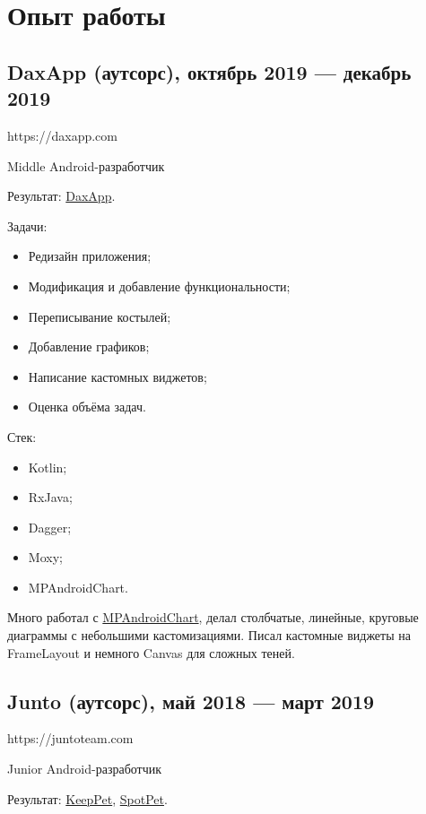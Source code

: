 \documentclass[a4paper,12pt]{article}
\begin{document}
    \section*{Опыт работы}

    \subsection*{DaxApp (аутсорс), октябрь 2019 --- декабрь 2019}

    https://daxapp.com\par
    Middle Android-разработчик

    Результат: \href{https://play.google.com/store/apps/details?id=com.app.qavala1}{DaxApp}.

    Задачи:
    \begin{itemize}
        \item Редизайн приложения;
        \item Модификация и добавление функциональности;
        \item Переписывание костылей;
        \item Добавление графиков;
        \item Написание кастомных виджетов;
        \item Оценка объёма задач.
    \end{itemize}

    Стек:
    \begin{itemize}
        \item Kotlin;
        \item RxJava;
        \item Dagger;
        \item Moxy;
        \item MPAndroidChart.
    \end{itemize}

    Много работал с \href{https://github.com/PhilJay/MPAndroidChart}{MPAndroidChart}, делал столбчатые, линейные, круговые диаграммы с небольшими кастомизациями. Писал кастомные виджеты на FrameLayout и немного Canvas для сложных теней.
    
    \subsection*{Junto (аутсорс), май 2018 --- март 2019}
    
    https://juntoteam.com\par
    Junior Android-разработчик
    
    Результат: \href{https://play.google.com/store/apps/details?id=com.juntoteam.keeppet}{KeepPet}, \href{https://play.google.com/store/apps/details?id=com.juntoteam.spotpet}{SpotPet}.
\end{document}
